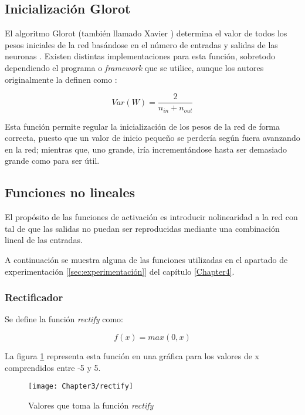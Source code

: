 \newpage



\subsection{Inicialización Glorot}

El algoritmo Glorot (también llamado Xavier \cite{glorot2010understanding}) determina el valor de todos los pesos
iniciales de la red basándose en el número de entradas y salidas de las neuronas \cite{glorot-lasagne}. Existen distintas implementaciones para esta función, sobretodo dependiendo el programa o \textit{framework} que se utilice, aunque los autores \cite{glorot2010understanding} originalmente la definen como :

\begin{equation}
Var(W)=\frac{2}{n_{in}+n_{out}}
\end{equation}

Esta función permite regular la inicialización de los pesos de la red de forma correcta, puesto que un valor de
inicio pequeño se perdería según fuera avanzando en la red; mientras que, uno grande, iría incrementándose hasta ser
demasiado grande como para ser útil.


\subsection{Funciones no lineales}

El propósito de las funciones de activación es introducir nolinearidad a la red con tal de que las salidas no puedan ser reproducidas mediante una combinación lineal de las entradas.

A continuación se muestra alguna de las funciones utilizadas en el apartado de experimentación [\ref{sec:experimentación}] del capítulo \ref{Chapter4}.


\subsubsection{Rectificador}

Se define la función \textit{rectify} como:

\begin{equation}
f(x) = max(0, x)
\end{equation}

La figura \ref{fig:rectify} representa esta función en una gráfica para los valores de x comprendidos entre -5 y 5.

\begin{figure}[ht]
  \centering
    \texttt{[image: Chapter3/rectify]}
  \caption{Valores que toma la función \textit{rectify}}
\label{fig:rectify}
\end{figure}


